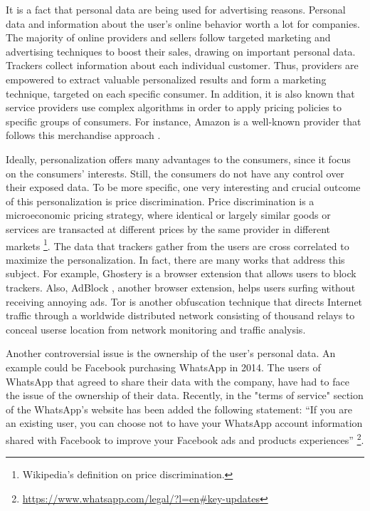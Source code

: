 It is a fact that personal data are being used for advertising reasons.
Personal data and information about the user's online behavior worth a lot for
companies. The majority of online providers and sellers follow targeted
marketing and advertising  techniques to boost their sales, drawing on
important personal data. Trackers collect information about each individual
customer. Thus, providers are empowered to extract valuable personalized results
and form a marketing technique, targeted on each specific consumer.
In addition, it is also known that service providers use complex algorithms
in order to apply pricing policies to specific groups of consumers.
For instance, Amazon is a well-known provider that follows this merchandise
approach \cite{chen2016empirical}.

Ideally, personalization offers many advantages to the consumers, since it focus
on the consumers' interests. Still, the consumers do not have any control over
their exposed data. To be more specific, one very interesting and crucial
outcome of this personalization is price discrimination. Price discrimination is
a microeconomic pricing strategy, where identical or largely similar goods or
services are transacted at different prices by the same provider in different
markets \footnote{Wikipedia's definition on price discrimination.}.
The data that trackers gather from the users are cross correlated to maximize
the personalization. In fact, there are many works that address this subject.
For example, Ghostery \cite{ghostery} is a browser extension that allows users
to block trackers. Also, AdBlock \cite{adblock}, another browser extension,
helps users surfing without receiving annoying ads. Tor \cite{syverson2004tor}
is another obfuscation technique that directs Internet traffic through a
worldwide distributed network consisting of thousand relays to conceal users¢
location from network monitoring and traffic analysis.

Another controversial issue is the ownership of the user's personal data.
An example could be Facebook purchasing WhatsApp in 2014. The users of WhatsApp 
that agreed to share their data with the company, have had to face the issue of 
the ownership of their data. Recently, in the "terms of service" section of the 
WhatsApp's website has been added the following statement: ``If you are an 
existing user, you can choose not to have your WhatsApp account information 
shared with Facebook to improve your Facebook ads and products experiences'' 
\footnote{\url{https://www.whatsapp.com/legal/?l=en\#key-updates}}.

